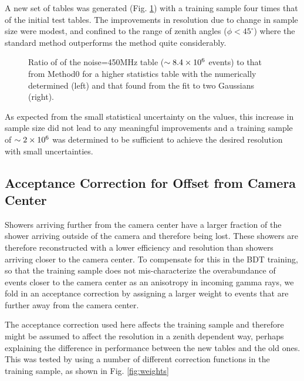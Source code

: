 \documentclass[main.tex]{subfiles}
\begin{document}
A new set of \disp tables was generated (Fig. \ref{fig:disp_ratio_450x4}) with a training sample four times that of the initial test tables. The improvements in resolution due to change in sample size were modest, and confined to the range of zenith angles ($\phi <45^\circ$) where the standard method outperforms the \disp method quite considerably.

\begin{figure}[htbp]
  \centering
  \caption[Higher statistics \disp table reconstruction vs noise.]{Ratio of \rse of the noise=450MHz \disp table ($\sim 8.4\times 10^{6}$ events) to that from Method0 for a higher statistics \disp table with the numerically determined \rse (left) and that found from the fit to two Gaussians (right).}
  \label{fig:disp_ratio_450x4}
\end{figure}

As expected from the small statistical uncertainty on the \rse values, this increase in sample size did not lead to any meaningful improvements and a training sample of $\sim 2\times 10^{6}$ was determined to be sufficient to achieve the desired resolution with small uncertainties.

\subsection{Acceptance Correction for Offset from Camera Center}
Showers arriving further from the camera center have a larger fraction of the shower arriving outside of the camera and therefore being lost. These showers are therefore reconstructed with a lower efficiency and resolution than showers arriving closer to the camera center. To compensate for this in the BDT training, so that the training sample does not mis-characterize the overabundance of events closer to the camera center as an anisotropy in incoming gamma rays, we fold in an acceptance correction by assigning a larger weight to events that are further away from the camera center.

The acceptance correction used here affects the training sample and therefore might be assumed to affect the resolution in a zenith dependent way, perhaps explaining the difference in performance between the new \disp tables and the old ones. This was tested by using a number of different correction functions in the training sample, as shown in Fig. \ref{fig:weights}
\end{document}
